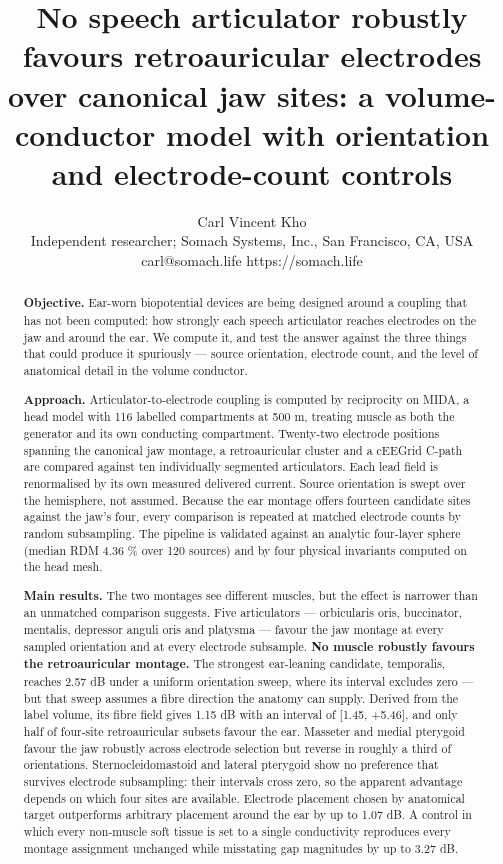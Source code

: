 \documentclass[
  11pt,
  letterpaper,
]{article}
\title{No speech articulator robustly favours retroauricular electrodes over canonical jaw sites: a volume-conductor model with orientation and electrode-count controls}
\author{Carl Vincent Kho \\ Independent researcher; Somach Systems, Inc., San Francisco, CA, USA \\ carl@somach.life \textperiodcentered{} https://somach.life}
\date{}
\begin{document}
\maketitle

\begin{abstract}


\textbf{Objective.} Ear-worn biopotential devices are being designed around a
coupling that has not been computed: how strongly each speech articulator
reaches electrodes on the jaw and around the ear. We compute it, and test the
answer against the three things that could produce it spuriously --- source
orientation, electrode count, and the level of anatomical detail in the volume
conductor.

\textbf{Approach.} Articulator-to-electrode coupling is computed by reciprocity on
MIDA, a head model with 116 labelled compartments at 500 \textmu{}m, treating muscle as
both the generator and its own conducting compartment. Twenty-two electrode
positions spanning the canonical jaw montage, a retroauricular cluster and a
cEEGrid C-path are compared against ten individually segmented articulators.
Each lead field is renormalised by its own measured delivered current. Source
orientation is swept over the hemisphere, not assumed. Because the ear
montage offers fourteen candidate sites against the jaw's four, every comparison
is repeated at matched electrode counts by random subsampling. The pipeline is
validated against an analytic four-layer sphere (median RDM 4.36 \% over 120
sources) and by four physical invariants computed on the head mesh.

\textbf{Main results.} The two montages see different muscles, but the effect is
narrower than an unmatched comparison suggests. Five articulators ---
orbicularis oris, buccinator, mentalis, depressor anguli oris and platysma ---
favour the jaw montage at every sampled orientation and at every electrode
subsample. \textbf{No muscle robustly favours the retroauricular montage.} The
strongest ear-leaning candidate, temporalis, reaches \textminus{}2.57 dB under a uniform
orientation sweep, where its interval excludes zero --- but that sweep assumes a
fibre direction the anatomy can supply. Derived from the label volume, its fibre
field gives \textminus{}1.15 dB with an interval of {[}\textminus{}1.45, +5.46{]}, and only half of
four-site retroauricular subsets favour the ear. Masseter and medial pterygoid
favour the jaw robustly across electrode selection but reverse in roughly a
third of orientations. Sternocleidomastoid and lateral pterygoid show no
preference that survives electrode subsampling: their intervals cross zero, so
the apparent advantage depends on which four sites are available. Electrode
placement chosen by anatomical target outperforms arbitrary placement around
the ear by up to 1.07 dB. A control in which every non-muscle soft tissue is
set to a single conductivity reproduces every montage assignment unchanged
while misstating gap magnitudes by up to 3.27 dB.


\end{abstract}
\end{document}
